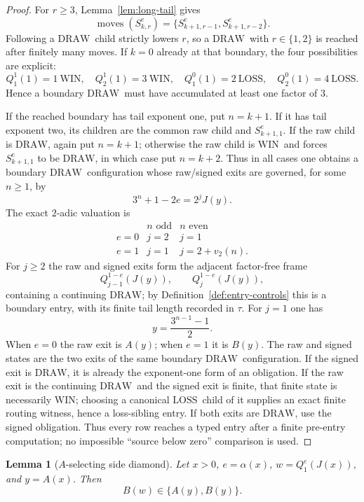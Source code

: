 \documentclass[11pt]{article}
\newtheorem{lemma}[theorem]{Lemma}
\newcommand{\WIN}{\ensuremath{\mathrm{WIN}}}
\newcommand{\LOSS}{\ensuremath{\mathrm{LOSS}}}
\newcommand{\DRAW}{\ensuremath{\mathrm{DRAW}}}
\newcommand{\Moves}{\operatorname{moves}}
\begin{document}
\begin{proof}
For $r\ge3$, Lemma~\ref{lem:long-tail} gives
\[
  \Moves(S_{k,r}^e)=\{S_{k+1,r-1}^e,S_{k+1,r-2}^e\}.
\]
Following a \DRAW\ child strictly lowers $r$, so a \DRAW\ with $r\in\{1,2\}$
is reached after finitely many moves. If $k=0$ already at that boundary, the
four possibilities are explicit:
\[
 Q_1^1(1)=1\ \WIN,\quad Q_2^1(1)=3\ \WIN,\quad
 Q_1^0(1)=2\ \LOSS,\quad Q_2^0(1)=4\ \LOSS.
\]
Hence a boundary \DRAW\ must have accumulated at least one factor of $3$.

If the reached boundary has tail exponent one, put $n=k+1$.  If it has
tail exponent two, its children are the common raw child and
$S_{k+1,1}^e$.  If the raw child is \DRAW, again put $n=k+1$; otherwise the
raw child is \WIN\ and forces $S_{k+1,1}^e$ to be \DRAW, in which case put
$n=k+2$.  Thus in all cases one obtains a boundary \DRAW\ configuration whose
raw/signed exits are governed, for some $n\ge1$, by
\[
  3^n+1-2e=2^jJ(y).
\]
The exact $2$-adic valuation is
\[
\begin{array}{c|cc}
 &n\text{ odd}&n\text{ even}\\ \hline
 e=0&j=2&j=1\\
 e=1&j=1&j=2+v_2(n).
\end{array}
\]
For $j\ge2$ the raw and signed exits form the adjacent factor-free frame
\[
  Q_{j-1}^{1-e}(J(y)),\qquad Q_j^{1-e}(J(y)),
\]
containing a continuing \DRAW; by Definition~\ref{def:entry-controls} this is a boundary entry, with its finite tail length recorded in $\tau$. For $j=1$ one has
\[
  y=\frac{3^{n-1}-1}{2}.
\]
When $e=0$ the raw exit is $A(y)$; when $e=1$ it is $B(y)$. The raw and
signed states are the two exits of the same boundary \DRAW\ configuration.
If the signed exit is \DRAW, it is already the exponent-one form of an
obligation. If the raw exit is the continuing \DRAW\ and the signed exit is
finite, that finite state is necessarily \WIN; choosing a canonical \LOSS\
child of it supplies an exact finite routing witness, hence a loss-sibling
entry. If both exits are \DRAW, use the signed obligation. Thus every row
reaches a typed entry after a finite pre-entry computation; no impossible
``source below zero'' comparison is used.
\end{proof}

\begin{lemma}[$A$-selecting side diamond]\label{lem:a-side}
Let $x>0$, $e=\alpha(x)$, $w=Q_1^e(J(x))$, and $y=A(x)$. Then
\[
  B(w)\in\{A(y),B(y)\}.
\]
\end{lemma}
\end{document}
